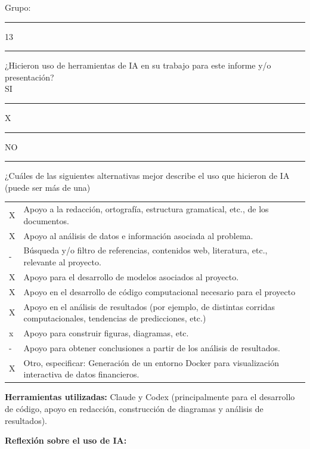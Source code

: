 \noindent Grupo:\rule{2cm}{0.4pt} 13 \rule{2cm}{0.4pt}

\vspace{0.6cm}

\noindent ¿Hicieron uso de herramientas de IA en su trabajo para este informe y/o presentación? \\
SI \rule{0.5cm}{0.4pt} X \rule{0.5cm}{0.4pt} \hspace{1cm} NO \rule{1.5cm}{0.4pt}

\vspace{0.7cm}

\noindent ¿Cuáles de las siguientes alternativas mejor describe el uso que hicieron de IA (puede ser más de una)

\vspace{0.4cm}

\noindent
\begin{tabular}{@{}p{} p{}@{}}
X & Apoyo a la redacción, ortografía, estructura gramatical, etc., de los documentos. \\
X & Apoyo al análisis de datos e información asociada al problema. \\
-  & Búsqueda y/o filtro de referencias, contenidos web, literatura, etc., relevante al proyecto. \\
X & Apoyo para el desarrollo de modelos asociados al proyecto. \\
X & Apoyo en el desarrollo de código computacional necesario para el proyecto \\
X & Apoyo en el análisis de resultados (por ejemplo, de distintas corridas computacionales, tendencias de predicciones, etc.) \\
x  & Apoyo para construir figuras, diagramas, etc. \\
- & Apoyo para obtener conclusiones a partir de los análisis de resultados. \\
X & Otro, especificar: Generación de un entorno Docker para visualización interactiva de datos financieros. \\
\end{tabular}

\vspace{0.8cm}

\noindent \textbf{Herramientas utilizadas:} Claude y Codex (principalmente para el desarrollo de código, apoyo en redacción, construcción de diagramas y análisis de resultados).

\vspace{0.6cm}

\noindent \textbf{Reflexión sobre el uso de IA:}


